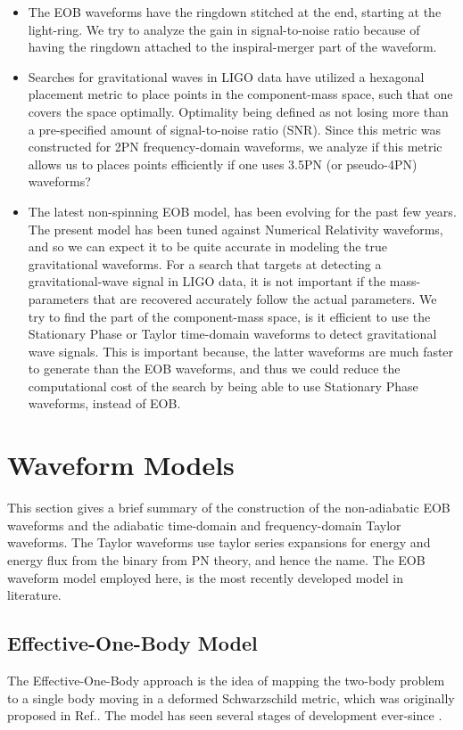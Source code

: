 \documentclass[aps,
prd,
amsmath,
amssymb,
twocolumn,
floatfix,
groupedaddress]{revtex4-1}
\begin{document}
\begin{itemize}
\item
The EOB waveforms have the ringdown stitched at the end, starting at the light-ring. We try to analyze the gain in signal-to-noise ratio because of having the ringdown attached to the inspiral-merger part of the waveform.
\item
Searches for gravitational waves in LIGO data have utilized a hexagonal placement metric \cite{SathyaMetric2PN} to place points in the component-mass space, such that one covers the space optimally. Optimality being defined as not losing more than a pre-specified amount of signal-to-noise ratio (SNR). Since this metric was constructed for 2PN frequency-domain waveforms, we analyze if this metric allows us to places points efficiently if one uses 3.5PN (or pseudo-4PN) waveforms?
\item
The latest non-spinning EOB model\citep{BuonannoEOBv2Main}, has been evolving for the past few years. The present model has been tuned against Numerical Relativity waveforms, and so we can expect it to be quite accurate in modeling the true gravitational waveforms. For a search that targets at detecting a gravitational-wave signal in LIGO data, it is not important if the mass-parameters that are recovered accurately follow the actual parameters. We try to find the part of the component-mass space, is it efficient to use the Stationary Phase or Taylor time-domain waveforms to detect gravitational wave signals. This is important because, the latter waveforms are much faster to generate than the EOB waveforms, and thus we could reduce the computational cost of the search by being able to use Stationary Phase waveforms, instead of EOB. 
\end{itemize}

\section{Waveform Models}\label{sec:level1:Waveform}
This section gives a brief summary of the construction of the non-adiabatic EOB waveforms and the adiabatic time-domain and frequency-domain Taylor waveforms. The Taylor waveforms use taylor series expansions for energy and energy flux from the binary from PN theory, and hence the name. The EOB waveform model employed here, is the most recently developed model \cite{BuonannoEOBv2Main} in literature. 

\subsection{Effective-One-Body Model}\label{sec:level2:Waveform:EOB}
The Effective-One-Body approach is the idea of mapping the two-body problem to a single body moving in a deformed Schwarzschild metric, which was originally proposed in Ref.\citep{EOBOriginalBuonannoDamour}. The model has seen several stages of development ever-since \cite{EOBdevel01,EOBdevel02,EOBNRdevel03,DamourFluxhlm01,EOBNRdevel01}.
\end{document}
